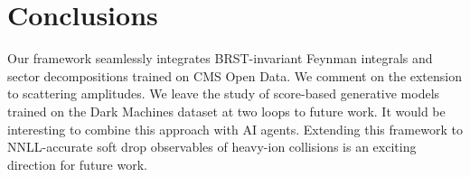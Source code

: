 \section{Conclusions}\label{sec:conclusions}

Our framework seamlessly integrates BRST-invariant Feynman integrals and
sector decompositions trained on CMS Open Data. We comment on the
extension to scattering amplitudes. We leave the study of score-based
generative models trained on the Dark Machines dataset at two loops to
future work. It would be interesting to combine this approach with AI
agents. Extending this framework to NNLL-accurate soft drop observables
of heavy-ion collisions is an exciting direction for future work.

